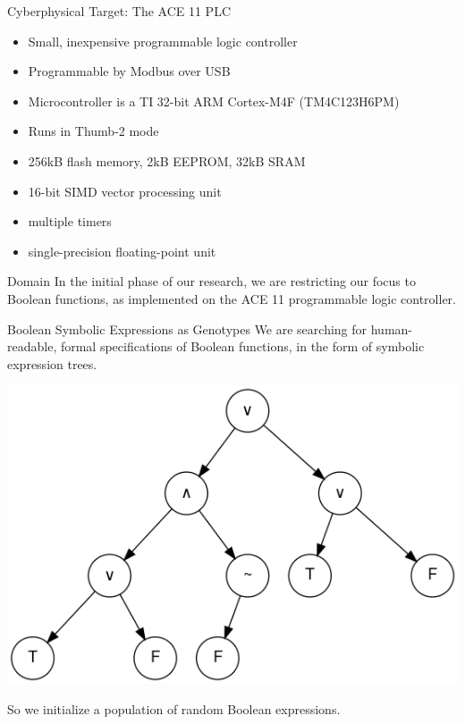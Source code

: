 \documentclass[presentation]{beamer}
\begin{document}
\begin{frame}[label={sec:org97a0077}]{Cyberphysical Target: The ACE 11 PLC}
\begin{itemize}
\item Small, inexpensive programmable logic controller
\item Programmable by Modbus over USB
\item Microcontroller is a TI 32-bit ARM Cortex-M4F (TM4C123H6PM)
\item Runs in Thumb-2 mode
\item 256kB flash memory, 2kB EEPROM, 32kB SRAM
\item 16-bit SIMD vector processing unit
\item multiple timers
\item single-precision floating-point unit
\end{itemize}
\end{frame}

\begin{frame}[label={sec:org7d41a0c}]{Domain}
In the initial phase of our research, we are restricting our focus to \alert{Boolean functions}, as implemented on the ACE 11 programmable logic controller.
\end{frame}

\begin{frame}[label={sec:org97f646b}]{Boolean Symbolic Expressions as Genotypes}
We are searching for human-readable, formal specifications of Boolean functions, in the form of symbolic expression trees.

\begin{center}
\includegraphics[width=.9\linewidth]{./img/boolean_sexp.png}
\end{center}

So we initialize a population of random Boolean expressions.
\end{frame}
\end{document}
